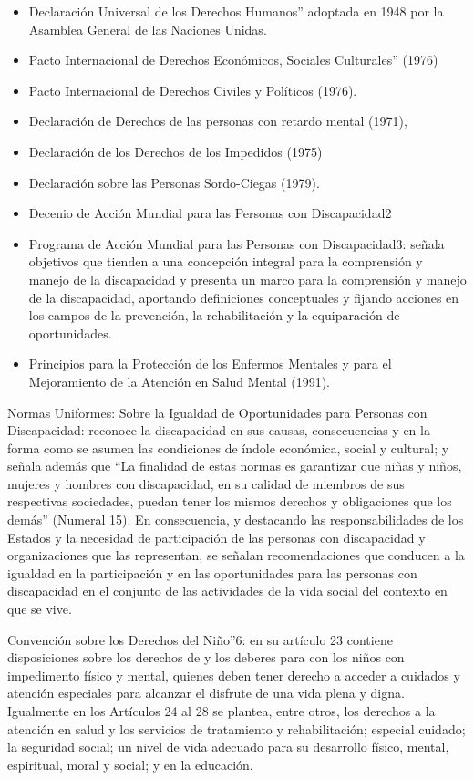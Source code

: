 \documentclass[a4paper, 12pt, oneside]{article}
\begin{document}
	\begin{itemize}
		\item Declaración Universal de los Derechos Humanos” adoptada en 1948 por la Asamblea General de las Naciones Unidas.
		\item Pacto Internacional de Derechos Económicos, Sociales Culturales” (1976)
		\item Pacto Internacional de Derechos Civiles y Políticos (1976).
		\item Declaración de Derechos de las personas con retardo mental (1971),
		\item Declaración de los Derechos de los Impedidos (1975)
		\item Declaración sobre las Personas Sordo-Ciegas (1979).
		\item Decenio de Acción Mundial para las Personas con Discapacidad2
		\item Programa de Acción Mundial para las Personas con Discapacidad3: señala objetivos que tienden a una concepción integral para la comprensión y manejo de la discapacidad y presenta un marco para la comprensión y manejo de la discapacidad, aportando definiciones conceptuales y fijando acciones en los campos de la prevención, la rehabilitación y la equiparación de oportunidades.
		\item Principios para la Protección de los Enfermos Mentales y para el Mejoramiento de la Atención en Salud Mental (1991).
	\end{itemize}

	Normas Uniformes: Sobre la Igualdad de Oportunidades para Personas con Discapacidad: reconoce la discapacidad en sus causas, consecuencias y en la forma como se asumen las condiciones de índole económica, social y cultural; y señala además que “La finalidad de estas normas es garantizar que niñas y niños, mujeres y hombres con discapacidad, en su calidad de miembros de sus respectivas sociedades, puedan tener los mismos derechos y obligaciones que los demás” (Numeral 15). En consecuencia, y destacando las responsabilidades de los Estados y la necesidad de participación de las personas con discapacidad y organizaciones que las representan, se señalan recomendaciones que conducen a la igualdad en la participación y en las oportunidades para las personas con discapacidad en el conjunto de las actividades de la vida social del contexto en que se vive.

	Convención sobre los Derechos del Niño”6: en su artículo 23 contiene disposiciones sobre los derechos de y los deberes para con los niños con impedimento físico y mental, quienes deben tener derecho a acceder a cuidados y atención especiales para alcanzar el disfrute de una vida plena y digna. Igualmente en los Artículos 24 al 28 se plantea, entre otros, los derechos a la atención en salud y los servicios de tratamiento y rehabilitación; especial cuidado; la seguridad social; un nivel de vida adecuado para su desarrollo físico, mental, espiritual, moral y social; y en la educación.
\end{document}
